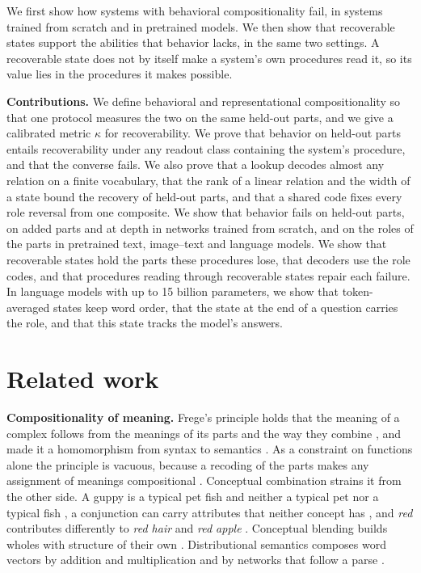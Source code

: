 \documentclass[10pt]{article}
\theoremstyle{plain}
\theoremstyle{remark}
\begin{document}
We first show how systems with behavioral compositionality fail, in systems trained from scratch and in pretrained models. We then show that recoverable states support the abilities that behavior lacks, in the same two settings. A recoverable state does not by itself make a system's own procedures read it, so its value lies in the procedures it makes possible.

\textbf{Contributions.} We define behavioral and representational compositionality so that one protocol measures the two on the same held-out parts, and we give a calibrated metric $\kappa$ for recoverability. We prove that behavior on held-out parts entails recoverability under any readout class containing the system's procedure, and that the converse fails. We also prove that a lookup decodes almost any relation on a finite vocabulary, that the rank of a linear relation and the width of a state bound the recovery of held-out parts, and that a shared code fixes every role reversal from one composite. We show that behavior fails on held-out parts, on added parts and at depth in networks trained from scratch, and on the roles of the parts in pretrained text, image--text and language models. We show that recoverable states hold the parts these procedures lose, that decoders use the role codes, and that procedures reading through recoverable states repair each failure. In language models with up to 15 billion parameters, we show that token-averaged states keep word order, that the state at the end of a question carries the role, and that this state tracks the model's answers.

\section{Related work}
\label{sec:related}

\textbf{Compositionality of meaning.} Frege's principle holds that the meaning of a complex follows from the meanings of its parts and the way they combine \citep{frege1892,frege1923}, and \citet{montague1970} made it a homomorphism from syntax to semantics \citep[see][]{janssen1997}. As a constraint on functions alone the principle is vacuous, because a recoding of the parts makes any assignment of meanings compositional \citep{zadrozny1994,westerstahl1998}. Conceptual combination strains it from the other side. A guppy is a typical pet fish and neither a typical pet nor a typical fish \citep{osherson1981,fodor1996}, a conjunction can carry attributes that neither concept has \citep{hampton1987}, and \emph{red} contributes differently to \emph{red hair} and \emph{red apple} \citep{kamp1995}. Conceptual blending builds wholes with structure of their own \citep{fauconnier2002}. Distributional semantics composes word vectors by addition and multiplication \citep{mitchell2010} and by networks that follow a parse \citep{socher2013}.
\end{document}
